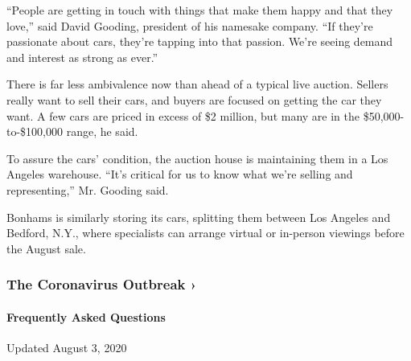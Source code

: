 ``People are getting in touch with things that make them happy and that
they love,'' said David Gooding, president of his namesake company. ``If
they're passionate about cars, they're tapping into that passion. We're
seeing demand and interest as strong as ever.''

There is far less ambivalence now than ahead of a typical live auction.
Sellers really want to sell their cars, and buyers are focused on
getting the car they want. A few cars are priced in excess of \$2
million, but many are in the \$50,000-to-\$100,000 range, he said.

To assure the cars' condition, the auction house is maintaining them in
a Los Angeles warehouse. ``It's critical for us to know what we're
selling and representing,'' Mr. Gooding said.

Bonhams is similarly storing its cars, splitting them between Los
Angeles and Bedford, N.Y., where specialists can arrange virtual or
in-person viewings before the August sale.

\href{https://www.nytimes3xbfgragh.onion/news-event/coronavirus?action=click\&pgtype=Article\&state=default\&region=MAIN_CONTENT_3\&context=storylines_faq}{}

\hypertarget{the-coronavirus-outbreak-}{%
\subsubsection{The Coronavirus Outbreak
›}\label{the-coronavirus-outbreak-}}

\hypertarget{frequently-asked-questions}{%
\paragraph{Frequently Asked
Questions}\label{frequently-asked-questions}}

Updated August 3, 2020

